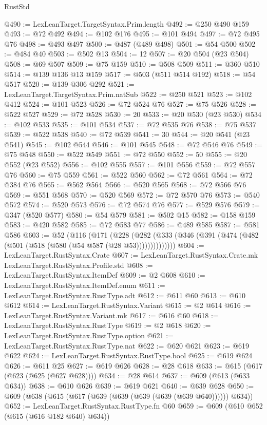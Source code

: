 \begin{lexlean}{RustStd}
\begin{coremodule}
@490 := LexLeanTarget.TargetSyntax.Prim.length
@492 := @250 @490 @159
@493 := @72 @492
@494 := @102 @176
@495 := @101 @494
@497 := @72 @495 @76
@498 := @493 @497
@500 := @487 (@489 @498)
@501 := @54 @500
@502 := @484 @40
@503 := @502 @13
@504 := 12
@507 := @20 @504 (@23 @504)
@508 := @69 @507
@509 := @75 @159
@510 := @508 @509
@511 := @360 @510
@514 := @139 @136 @13 @159
@517 := @503 (@511 @514 @192)
@518 := @54 @517
@520 := @139 @306 @292
@521 := LexLeanTarget.TargetSyntax.Prim.natSub
@522 := @250 @521
@523 := @102 @412
@524 := @101 @523
@526 := @72 @524 @76
@527 := @75 @526
@528 := @522 @527
@529 := @72 @528
@530 := 20
@533 := @20 @530 (@23 @530)
@534 := @102 @533
@535 := @101 @534
@537 := @72 @535 @76
@538 := @75 @537
@539 := @522 @538
@540 := @72 @539
@541 := 30
@544 := @20 @541 (@23 @541)
@545 := @102 @544
@546 := @101 @545
@548 := @72 @546 @76
@549 := @75 @548
@550 := @522 @549
@551 := @72 @550
@552 := 50
@555 := @20 @552 (@23 @552)
@556 := @102 @555
@557 := @101 @556
@559 := @72 @557 @76
@560 := @75 @559
@561 := @522 @560
@562 := @72 @561
@564 := @72 @384 @76
@565 := @562 @564
@566 := @520 @565
@568 := @72 @566 @76
@569 := @551 @568
@570 := @520 @569
@572 := @72 @570 @76
@573 := @540 @572
@574 := @520 @573
@576 := @72 @574 @76
@577 := @529 @576
@579 := @347 (@520 @577)
@580 := @54 @579
@581 := @502 @15
@582 := @158 @159
@583 := @420 @582
@585 := @72 @583 @77
@586 := @489 @585
@587 := @581 @586
@603 := @52
    (@116
      (@171
        (@228 (@282 (@333 (@346 (@391 (@474 (@482 (@501 (@518 (@580 (@54 @587 (@28 @53))))))))))))))
@604 := LexLeanTarget.RustSyntax.Crate
@607 := LexLeanTarget.RustSyntax.Crate.mk LexLeanTarget.RustSyntax.Profile.std
@608 := LexLeanTarget.RustSyntax.ItemDef
@609 := @2 @608
@610 := LexLeanTarget.RustSyntax.ItemDef.enum
@611 := LexLeanTarget.RustSyntax.RustType.adt
@612 := @611 @60
@613 := @610 @612
@614 := LexLeanTarget.RustSyntax.Variant
@615 := @2 @614
@616 := LexLeanTarget.RustSyntax.Variant.mk
@617 := @616 @60
@618 := LexLeanTarget.RustSyntax.RustType
@619 := @2 @618
@620 := LexLeanTarget.RustSyntax.RustType.option
@621 := LexLeanTarget.RustSyntax.RustType.nat
@622 := @620 @621
@623 := @619 @622
@624 := LexLeanTarget.RustSyntax.RustType.bool
@625 := @619 @624
@626 := @611 @25
@627 := @619 @626
@628 := @28 @618
@633 := @615 (@617 (@623 (@625 (@627 @628))))
@634 := @28 @614
@637 := @609 (@613 (@633 @634))
@638 := @610 @626
@639 := @619 @621
@640 := @639 @628
@650 := @609 (@638 (@615 (@617 (@639 (@639 (@639 (@639 (@639 @640)))))) @634))
@652 := LexLeanTarget.RustSyntax.RustType.fn @60
@659 := @609 (@610 @652 (@615 (@616 @182 @640) @634))

\end{coremodule}
\end{lexlean}
